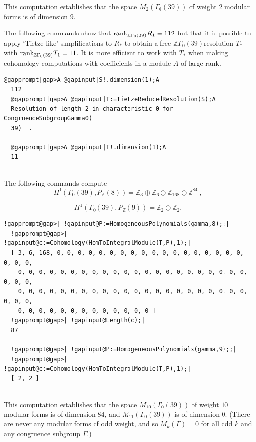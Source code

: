 \documentclass[a4paper,11pt]{report}
\begin{document}
{{\begin{Verbatim}[commandchars=!@|,fontsize=\small,frame=single,label=Example]
\end{Verbatim}
 

This computation establishes that the space $M_2(\Gamma_0(39))$ of weight $2$ modular forms is of dimension $9$. 

The following commands show that ${\rm rank}_{\mathbb Z\Gamma_0(39)} R_1 = 112$ but that it is possible to apply `Tietze like' simplifications to $R_\ast$ to obtain a free $\mathbb Z\Gamma_0(39)$\texttt{}resolution $T_\ast$ with ${\rm rank}_{\mathbb Z\Gamma_0(39)} T_1 = 11$. It is more efficient to work with $T_\ast$ when making cohomology computations with coefficients in a module $A$ of large rank. 
\begin{Verbatim}[commandchars=@|A,fontsize=\small,frame=single,label=Example]
  @gapprompt|gap>A @gapinput|S!.dimension(1);A
  112
  @gapprompt|gap>A @gapinput|T:=TietzeReducedResolution(S);A
  Resolution of length 2 in characteristic 0 for CongruenceSubgroupGamma0(
  39)  . 
  
  @gapprompt|gap>A @gapinput|T!.dimension(1);A
  11
  
\end{Verbatim}
 

The following commands compute 
\[H^1(\Gamma_0(39),P_{\mathbb Z}(8)) = \mathbb Z_3 \oplus \mathbb Z_6 \oplus
\mathbb Z_{168} \oplus \mathbb Z^{84}\ ,\]
 
\[H^1(\Gamma_0(39),P_{\mathbb Z}(9)) = \mathbb Z_2 \oplus \mathbb Z_2 .\]
 
\begin{Verbatim}[commandchars=!@|,fontsize=\small,frame=single,label=Example]
  !gapprompt@gap>| !gapinput@P:=HomogeneousPolynomials(gamma,8);;|
  !gapprompt@gap>| !gapinput@c:=Cohomology(HomToIntegralModule(T,P),1);|
  [ 3, 6, 168, 0, 0, 0, 0, 0, 0, 0, 0, 0, 0, 0, 0, 0, 0, 0, 0, 0, 0, 0, 0, 0, 
    0, 0, 0, 0, 0, 0, 0, 0, 0, 0, 0, 0, 0, 0, 0, 0, 0, 0, 0, 0, 0, 0, 0, 0, 0, 
    0, 0, 0, 0, 0, 0, 0, 0, 0, 0, 0, 0, 0, 0, 0, 0, 0, 0, 0, 0, 0, 0, 0, 0, 0, 
    0, 0, 0, 0, 0, 0, 0, 0, 0, 0, 0, 0, 0 ]
  !gapprompt@gap>| !gapinput@Length(c);|
  87
  
  !gapprompt@gap>| !gapinput@P:=HomogeneousPolynomials(gamma,9);;|
  !gapprompt@gap>| !gapinput@c:=Cohomology(HomToIntegralModule(T,P),1);|
  [ 2, 2 ]
  
\end{Verbatim}
 

This computation establishes that the space $M_{10}(\Gamma_0(39))$ of weight $10$ modular forms is of dimension $84$, and $M_{11}(\Gamma_0(39))$ is of dimension $0$. (There are never any modular forms of odd weight, and so $M_k(\Gamma)=0$ for all odd $k$ and any congruence subgroup $\Gamma$.) 
}}
\end{document}
